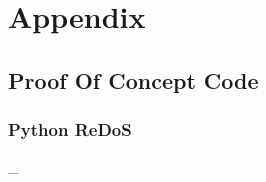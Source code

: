 \documentclass{IEEEtran}
\newcommand\pythonstyle{
        \lstset{style=python}
    }
\newcommand\pythonexternal[2][]{{
        \pythonstyle
        }}
\begin{document}
    \newpage
    \printbibliography

    \newpage
    \onecolumn
    \appendix
    \section{Appendix}
        \subsection{Proof Of Concept Code}
            \subsubsection{Python ReDoS}
            \label{sec:PyReDoS}
            \_
            \medskip
                \pythonexternal{Resources/regex.py}

    
\end{document}
